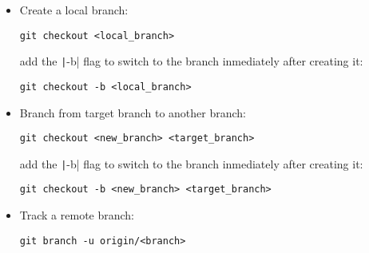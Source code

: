 \begin{itemize}
    \item Create a local branch:
    \begin{verbatim}
git checkout <local_branch>
    \end{verbatim}
    add the \texttt|-b| flag to switch to the branch inmediately after creating it:
    \begin{verbatim}
git checkout -b <local_branch>
    \end{verbatim}
    \item Branch from target branch to another branch:
    \begin{verbatim}
git checkout <new_branch> <target_branch>
    \end{verbatim}
    add the \texttt|-b| flag to switch to the branch inmediately after creating it:
    \begin{verbatim}
git checkout -b <new_branch> <target_branch>
    \end{verbatim}
    \item Track a remote branch:
    \begin{verbatim}
git branch -u origin/<branch>
    \end{verbatim}
\end{itemize}
